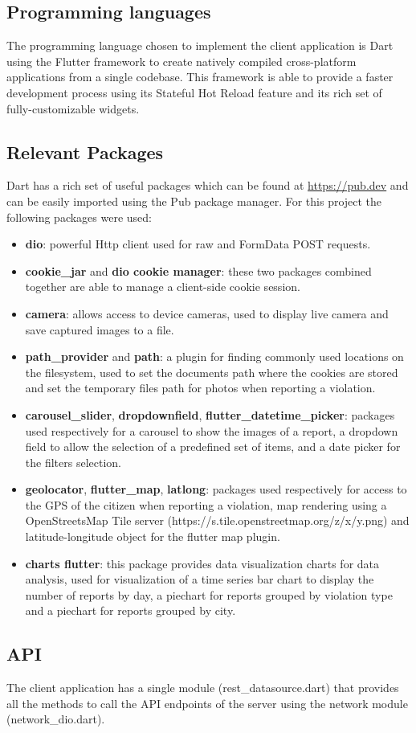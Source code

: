 \subsection{Programming languages}
The programming language chosen to implement the client application is Dart using the Flutter framework to create natively compiled cross-platform applications from a single codebase. This framework is able to provide a faster development process using its Stateful Hot Reload feature and its rich set of fully-customizable widgets.
\subsection{Relevant Packages}
Dart has a rich set of useful packages which can be found at \url{https://pub.dev} and can be easily imported using the Pub package manager. For this project the following packages were used:
	\begin{itemize}
		\item \textbf{dio}: powerful Http client used for raw and FormData POST requests.
		\item \textbf{cookie\_jar} and \textbf{dio cookie manager}: these two packages combined together are able to manage a client-side cookie session.
		\item \textbf{camera}: allows access to device cameras, used to display live camera and save captured images to a file.
		\item \textbf{path\_provider} and \textbf{path}: a plugin for finding commonly used locations on the filesystem, used to set the documents path where the cookies are stored and set the temporary files path for photos when reporting a violation.
		\item \textbf{carousel\_slider}, \textbf{dropdownfield}, \textbf{flutter\_datetime\_picker}: packages used respectively for a carousel to show the images of a report, a dropdown field to allow the selection of a predefined set of items, and a date picker for the filters selection.
		\item \textbf{geolocator}, \textbf{flutter\_map}, \textbf{latlong}: packages used respectively for access to the GPS of the citizen when reporting a violation, map rendering using a OpenStreetsMap Tile server (https://{s}.tile.openstreetmap.org/{z}/{x}/{y}.png) and latitude-longitude object for the flutter map plugin.
		\item \textbf{charts flutter}: this package provides data visualization charts for data analysis, used for visualization of a time series bar chart to display the number of reports by day, a piechart for reports grouped by violation type and a piechart for reports grouped by city.
	\end{itemize}
\subsection{API}
The client application has a single module (rest\_datasource.dart) that provides all the methods to call the API endpoints of the server using the network module (network\_dio.dart).